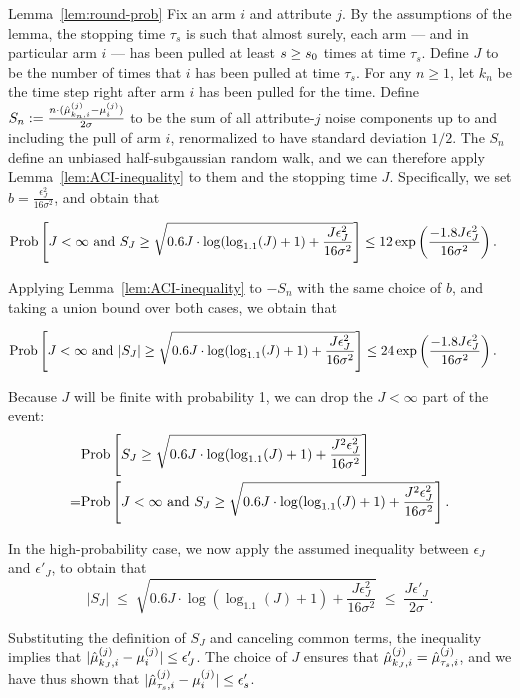 \begin{extraproof}{Lemma~\ref{lem:round-prob}}
Fix an arm $i$ and attribute $j$.
By the assumptions of the lemma,
the stopping time $\tau_s$ is such that almost surely,
each arm --- and in particular arm $i$ --- has been pulled at least
$s \geq s_0$ times at time $\tau_s$.
Define $J$ to be the number of times that $i$ has been pulled at
time $\tau_s$.
For any $n \geq 1$, let $k_n$ be the time step right after arm $i$ has
been pulled for the  time. Define
$S_n := \frac{n \cdot (\hat{\mu}_{k_n,i}^{(j)} - \mu_{i}^{(j)})}{2 \sigma}$
to be the sum of all attribute-$j$ noise components up to and
including the  pull of arm $i$,
renormalized to have standard deviation $1/2$.
The $S_n$ define an unbiased half-subgaussian random walk,
and we can therefore apply Lemma~\ref{lem:ACI-inequality} to them and
the stopping time $J$.
Specifically, we set $b = \frac{\epsilon_J^2}{16 \sigma^2}$,
and obtain that

\begin{align*}
\Prob{J < \infty \mbox{ and } S_J \geq 
\sqrt{0.6 J \cdot \log (\log_{1.1}(J) + 1) + \frac{J \epsilon_J^2}{16 \sigma^2}}}
& \leq 12 \exp \left( \frac{-1.8 J \epsilon_J^2}{16 \sigma^2} \right).
\end{align*}

Applying Lemma~\ref{lem:ACI-inequality} to $-S_n$ with the same choice
of $b$, and taking a union bound over both cases, we obtain that

\begin{align*}
\Prob{J < \infty \mbox{ and } |S_J| \geq 
\sqrt{0.6 J \cdot \log (\log_{1.1}(J) + 1) + \frac{J \epsilon_J^2}{16 \sigma^2}}}
& \leq 24 \exp \left( \frac{-1.8 J \epsilon_J^2}{16 \sigma^2} \right).
\end{align*}

Because $J$ will be finite with probability 1, we can drop the
$J < \infty$ part of the event:
\begin{align*}
& \Prob{S_J \geq 
\sqrt{0.6 J \cdot \log (\log_{1.1}(J) + 1) + \frac{J^2 \epsilon_J^2}{16
    \sigma^2}}}\\
= & \Prob{J < \infty \mbox{ and } S_J \geq 
\sqrt{0.6 J \cdot \log (\log_{1.1}(J) + 1) + \frac{J^2 \epsilon_J^2}{16
    \sigma^2}}}.
\end{align*}

In the high-probability case, we now apply the assumed inequality
between $\epsilon_J$ and $\epsilon'_J$, to obtain that
\[
|S_J| \; \leq \;
\sqrt{0.6 J \cdot \log (\log_{1.1}(J) + 1) + \frac{J \epsilon_J^2}{16 \sigma^2}}
\; \leq \; \frac{J \epsilon'_J}{2 \sigma}.
\]

Substituting the definition of $S_J$ and canceling common terms,
the inequality implies that
$|\hat{\mu}_{k_J,i}^{(j)} - \mu_{i}^{(j)}| \leq \epsilon'_J$.
The choice of $J$ ensures that
$\hat{\mu}_{k_J,i}^{(j)} = \hat{\mu}_{\tau_s,i}^{(j)}$,
and we have thus shown that
$|\hat{\mu}_{\tau_s,i}^{(j)} - \mu_{i}^{(j)}| \leq \epsilon'_s$.
\end{extraproof}


